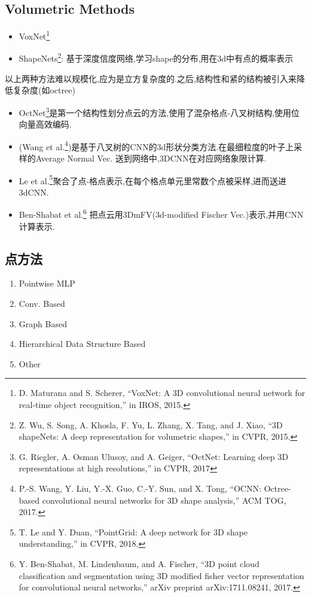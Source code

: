 \documentclass{article}
\begin{document}
\subsection{Volumetric Methods}
\begin{itemize}
    \item VoxNet\footnote{D. Maturana and S. Scherer, “VoxNet: A 3D convolutional neural network for real-time object recognition,” in IROS, 2015.}
    \item ShapeNets\footnote{Z. Wu, S. Song, A. Khosla, F. Yu, L. Zhang, X. Tang, and J. Xiao, “3D shapeNets: A deep representation for volumetric shapes,” in
    CVPR, 2015.}: 基于深度信度网络,学习shape的分布,用在3d中有点的概率表示
\end{itemize}
以上两种方法难以规模化,应为是立方复杂度的.之后,结构性和紧的结构被引入来降低复杂度(如octree)
\begin{itemize}
    \item OctNet\footnote{G. Riegler, A. Osman Ulusoy, and A. Geiger, “OctNet: Learning deep 3D representations at high resolutions,” in CVPR, 2017}是第一个结构性划分点云的方法,使用了混杂格点-八叉树结构,使用位向量高效编码.
    \item (Wang et al.\footnote{P.-S. Wang, Y. Liu, Y.-X. Guo, C.-Y. Sun, and X. Tong, “OCNN: Octree-based convolutional neural networks for 3D shape
    analysis,” ACM TOG, 2017.})是基于八叉树的CNN的3d形状分类方法.在最细粒度的叶子上采样的Average Normal Vec. 送到网络中,3DCNN在对应网络象限计算.
    \item {Le et al.\footnote{T. Le and Y. Duan, “PointGrid: A deep network for 3D shape understanding,” in CVPR, 2018.}}聚合了点-格点表示,在每个格点单元里常数个点被采样,进而送进3dCNN.
    \item {Ben-Shabat et al.\footnote{Y. Ben-Shabat, M. Lindenbaum, and A. Fischer, “3D point cloud classification and segmentation using 3D modified fisher vector representation for convolutional neural networks,” arXiv
    preprint arXiv:1711.08241, 2017.}} 把点云用3DmFV(3d-modified Fischer Vec.)表示,并用CNN计算表示.
\end{itemize}
\subsection{点方法}
\begin{enumerate}
    \item Pointwise MLP
    \item Conv. Based
    \item Graph Based 
    \item Hierarchical Data Structure Based
    \item Other
\end{enumerate}
\end{document}
